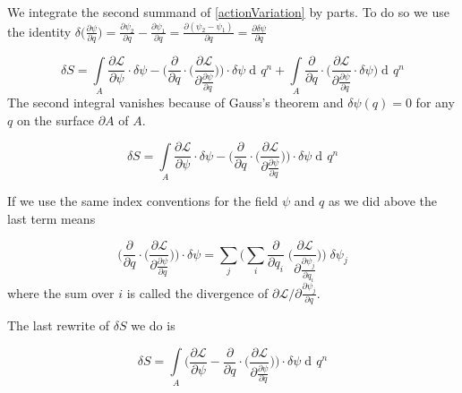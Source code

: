 \documentclass{article}
\DeclareMathOperator{\dd}{d\!}
\begin{document}
We integrate the second summand of \ref{actionVariation} by parts. To do so we use the identity
$\delta \big(\frac{\partial \psi} {\partial q}\big)
= \frac{\partial \psi_2} {\partial q} - \frac{\partial \psi_1} {\partial q}
= \frac{\partial (\psi_2 - \psi_1)} {\partial q}
= \frac{\partial \delta \psi} {\partial q}$

\begin{equation}
    \delta S = \int\limits_{A}
    \frac{\partial \mathcal{L}}{\partial \psi} \cdot \delta \psi
    -\bigg(\frac{\partial}{\partial q} \cdot \bigg( \frac{\partial \mathcal{L}}{\partial \frac{\partial \psi}{\partial q}} \bigg)\bigg) \cdot \delta \psi
    \dd q^n
    + \int\limits_{A} \frac{\partial}{\partial q} \cdot \bigg( \frac{\partial \mathcal{L}}{\partial \frac{\partial \psi}{\partial q}} \cdot \delta \psi \bigg) \dd q^n
\end{equation}
The second integral vanishes because of Gauss's theorem and $\delta \psi(q) = 0$ for any $q$ on the surface $\partial A$ of $A$.

\begin{equation}
\delta S = \int\limits_{A}
\frac{\partial \mathcal{L}}{\partial \psi} \cdot \delta \psi
-\bigg(\frac{\partial}{\partial q} \cdot \bigg( \frac{\partial \mathcal{L}}{\partial \frac{\partial \psi}{\partial q}} \bigg)\bigg) \cdot \delta \psi
\dd q^n
\end{equation}


If we use the same index conventions for the field $\psi$ and $q$ as we did above the last term means

\begin{equation}
    \bigg(\frac{\partial}{\partial q} \cdot \bigg( \frac{\partial \mathcal{L}}{\partial \frac{\partial \psi}{\partial q}} \bigg)\bigg) \cdot \delta \psi
    = \sum_j \bigg(\sum_i \frac{\partial}{\partial q_i} \; \bigg( \frac{\partial \mathcal{L}}{\partial \frac{\partial \psi_j}{\partial q_i}} \bigg)\bigg) \; \delta \psi_j
\end{equation}
where the sum over $i$ is called the divergence of $\partial \mathcal{L} / \partial \frac{\partial \psi_j}{\partial q}$.

The last rewrite of $\delta S$ we do is

\begin{equation}
    \delta S = \int\limits_{A}
    \bigg(
    \frac{\partial \mathcal{L}}{\partial \psi}
    -\frac{\partial}{\partial q} \cdot \bigg( \frac{\partial \mathcal{L}}{\partial \frac{\partial \psi}{\partial q}} \bigg)\bigg) \cdot \delta \psi
    \dd q^n
\end{equation}
\end{document}

